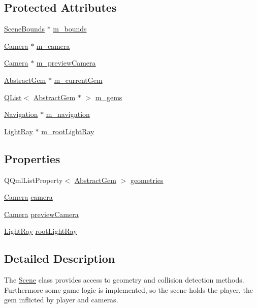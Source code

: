\subsection*{Protected Attributes}
\begin{DoxyCompactItemize}
\item 
\hyperlink{class_scene_bounds}{Scene\+Bounds} $\ast$ \hyperlink{class_scene_a62831eb6a67ce74ee608b4327bf069f3}{m\+\_\+bounds}
\item 
\hyperlink{class_camera}{Camera} $\ast$ \hyperlink{class_scene_ab37f5e133a5fe0803c3df42a4fcba7bf}{m\+\_\+camera}
\item 
\hyperlink{class_camera}{Camera} $\ast$ \hyperlink{class_scene_af1841b6c042a5edcf39653706f17cdd1}{m\+\_\+preview\+Camera}
\item 
\hyperlink{class_abstract_gem}{Abstract\+Gem} $\ast$ \hyperlink{class_scene_aff9d5a2212ba1b5813dc10177f0344cb}{m\+\_\+current\+Gem}
\item 
\hyperlink{class_q_list}{Q\+List}$<$ \hyperlink{class_abstract_gem}{Abstract\+Gem} $\ast$ $>$ \hyperlink{class_scene_a47d7b35730d7959a640339ed11d18866}{m\+\_\+gems}
\item 
\hyperlink{class_navigation}{Navigation} $\ast$ \hyperlink{class_scene_a595ab554271bd87c4c73f0cce175ff81}{m\+\_\+navigation}
\item 
\hyperlink{class_light_ray}{Light\+Ray} $\ast$ \hyperlink{class_scene_a766daf7b6a92c877f1fc57f3d8af9959}{m\+\_\+root\+Light\+Ray}
\end{DoxyCompactItemize}
\subsection*{Properties}
\begin{DoxyCompactItemize}
\item 
Q\+Qml\+List\+Property$<$ \hyperlink{class_abstract_gem}{Abstract\+Gem} $>$ \hyperlink{class_scene_a426e8a21801c9cc93c5cd90896ed745d}{geometries}
\item 
\hyperlink{class_camera}{Camera} \hyperlink{class_scene_ab915c54546b8cecc3ae6bb7c8983518c}{camera}
\item 
\hyperlink{class_camera}{Camera} \hyperlink{class_scene_ae8f457e7e69cac64f533e02f4f13e725}{preview\+Camera}
\item 
\hyperlink{class_light_ray}{Light\+Ray} \hyperlink{class_scene_a437a4ce938a6de368c2a6abba0ec3f3d}{root\+Light\+Ray}
\end{DoxyCompactItemize}


\subsection{Detailed Description}
The \hyperlink{class_scene}{Scene} class provides access to geometry and collision detection methods. Furthermore some game logic is implemented, so the scene holds the player, the gem inflicted by player and cameras. 

